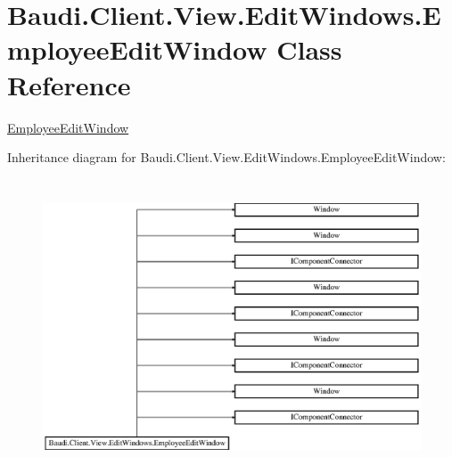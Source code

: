 \hypertarget{class_baudi_1_1_client_1_1_view_1_1_edit_windows_1_1_employee_edit_window}{}\section{Baudi.\+Client.\+View.\+Edit\+Windows.\+Employee\+Edit\+Window Class Reference}
\label{class_baudi_1_1_client_1_1_view_1_1_edit_windows_1_1_employee_edit_window}


\hyperlink{class_baudi_1_1_client_1_1_view_1_1_edit_windows_1_1_employee_edit_window}{Employee\+Edit\+Window}  


Inheritance diagram for Baudi.\+Client.\+View.\+Edit\+Windows.\+Employee\+Edit\+Window\+:\begin{figure}[H]
\begin{center}
\leavevmode
\includegraphics[height=8.777430cm]{class_baudi_1_1_client_1_1_view_1_1_edit_windows_1_1_employee_edit_window}
\end{center}
\end{figure}
